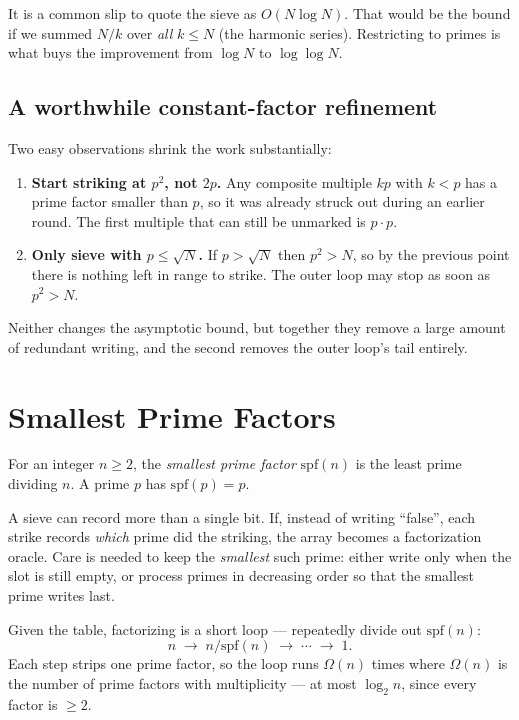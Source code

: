 \documentclass[11pt]{article}
\begin{document}
\begin{notebox}
It is a common slip to quote the sieve as $O(N \log N)$. That would be the
bound if we summed $N/k$ over \emph{all} $k \le N$ (the harmonic series).
Restricting to primes is what buys the improvement from $\log N$ to
$\log\log N$.
\end{notebox}

\subsection{A worthwhile constant-factor refinement}
Two easy observations shrink the work substantially:

\begin{enumerate}[leftmargin=1.5em]
  \item \textbf{Start striking at $p^2$, not $2p$.} Any composite multiple
        $kp$ with $k < p$ has a prime factor smaller than $p$, so it was
        already struck out during an earlier round. The first multiple that
        can still be unmarked is $p \cdot p$.
  \item \textbf{Only sieve with $p \le \sqrt{N}$.} If $p > \sqrt{N}$ then
        $p^2 > N$, so by the previous point there is nothing left in range to
        strike. The outer loop may stop as soon as $p^2 > N$.
\end{enumerate}

Neither changes the asymptotic bound, but together they remove a large amount
of redundant writing, and the second removes the outer loop's tail entirely.

\section{Smallest Prime Factors}

\begin{definitionbox}
For an integer $n \ge 2$, the \emph{smallest prime factor} $\mathrm{spf}(n)$ is
the least prime dividing $n$. A prime $p$ has $\mathrm{spf}(p) = p$.
\end{definitionbox}

A sieve can record more than a single bit. If, instead of writing ``false'',
each strike records \emph{which} prime did the striking, the array becomes a
factorization oracle. Care is needed to keep the \emph{smallest} such prime:
either write only when the slot is still empty, or process primes in
decreasing order so that the smallest prime writes last.

Given the table, factorizing is a short loop --- repeatedly divide out
$\mathrm{spf}(n)$:
\[
  n \;\longrightarrow\; n / \mathrm{spf}(n) \;\longrightarrow\; \cdots
  \;\longrightarrow\; 1 .
\]
Each step strips one prime factor, so the loop runs $\Omega(n)$ times where
$\Omega(n)$ is the number of prime factors with multiplicity --- at most
$\log_2 n$, since every factor is $\ge 2$.
\end{document}
